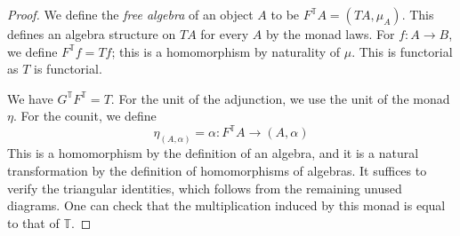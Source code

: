 \begin{proof}
    We define the \emph{free algebra} of an object \( A \) to be \( F^{\mathbb T}A = (TA, \mu_A) \).
    This defines an algebra structure on \( TA \) for every \( A \) by the monad laws.
    For \( f : A \to B \), we define \( F^{\mathbb T}f = Tf \); this is a homomorphism by naturality of \( \mu \).
    This is functorial as \( T \) is functorial.

    We have \( G^{\mathbb T} F^{\mathbb T} = T \).
    For the unit of the adjunction, we use the unit of the monad \( \eta \).
    For the counit, we define
    \[ \eta_{(A,\alpha)} = \alpha : F^{\mathbb T} A \to (A, \alpha) \]
    This is a homomorphism by the definition of an algebra, and it is a natural transformation by the definition of homomorphisms of algebras.
    It suffices to verify the triangular identities, which follows from the remaining unused diagrams.
    One can check that the multiplication induced by this monad is equal to that of \( \mathbb T \).
\end{proof}

